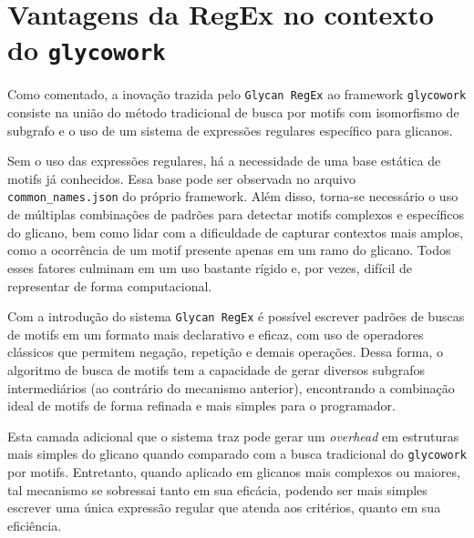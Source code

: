 \section{Vantagens da RegEx no contexto do \texttt{glycowork}}

Como comentado, a inovação trazida pelo \texttt{Glycan RegEx} ao framework
\texttt{glycowork} consiste na união do método tradicional de busca por motifs
com isomorfismo de subgrafo e o uso de um sistema de expressões regulares
específico para glicanos.

Sem o uso das expressões regulares, há a necessidade de uma base estática de
motifs já conhecidos. Essa base pode ser observada no arquivo
\texttt{common\_names.json} do próprio framework. Além disso, torna-se
necessário o uso de múltiplas combinações de padrões para detectar motifs
complexos e específicos do glicano, bem como lidar com a dificuldade de
capturar contextos mais amplos, como a ocorrência de um motif presente apenas
em um ramo do glicano. Todos esses fatores culminam em um uso bastante rígido
e, por vezes, difícil de representar de forma computacional.

Com a introdução do sistema \texttt{Glycan RegEx} é possível escrever padrões
de buscas de motifs em um formato mais declarativo e eficaz, com uso de
operadores clássicos que permitem negação, repetição e demais operações. Dessa
forma, o algoritmo de busca de motifs tem a capacidade de gerar diversos
subgrafos intermediários (ao contrário do mecanismo anterior), encontrando a
combinação ideal de motifs de forma refinada e mais simples para o programador.

Esta camada adicional que o sistema traz pode gerar um \textit{overhead} em
estruturas mais simples do glicano quando comparado com a busca tradicional do
\texttt{glycowork} por motifs. Entretanto, quando aplicado em glicanos mais
complexos ou maiores, tal mecanismo se sobressai tanto em sua eficácia, podendo
ser mais simples escrever uma única expressão regular que atenda aos critérios,
quanto em sua eficiência.

